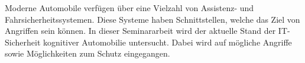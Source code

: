 
\abstract

Moderne Automobile verfügen über eine Vielzahl von Assistenz- und
Fahrsicherheitssystemen. Diese Systeme haben Schnittstellen, welche das Ziel
von Angriffen sein können. In dieser Seminararbeit wird der aktuelle Stand der
IT-Sicherheit kognitiver Automobilie untersucht. Dabei wird auf mögliche
Angriffe sowie Möglichkeiten zum Schutz eingegangen.
